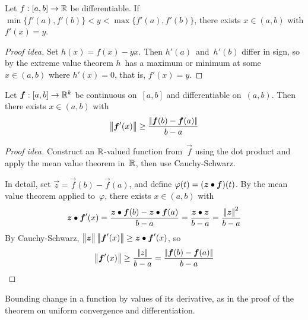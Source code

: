 \begin{thm}
Let \(f:[a,b]\to\mathbb{R}\) be differentiable. If \(\min\{f'(a),f'(b)\}<y<\max\{f'(a),f'(b)\}\), there exists \(x\in(a,b)\) with \(f'(x)=y\).
\end{thm}
\begin{proof}[Proof idea]
Set \(h(x)=f(x)-yx\). Then \(h'(a)\)~and~\(h'(b)\) differ in sign, so by the extreme value theorem \(h\)~has a maximum or minimum at some \(x\in(a,b)\) where \(h'(x)=0\), that is, \(f'(x)=y\).
\end{proof}

\begin{thm}
Let \(\boldsymbol{f}:[a,b]\to\mathbb{R}^k\) be continuous on~\([a,b]\) and differentiable on~\((a,b)\). Then there exists \(x\in(a,b)\) with
\[\left|\!\left|{\boldsymbol{f}'(x)}\right|\!\right|\ge\frac{\left|\!\left|{\boldsymbol{f}(b)-\boldsymbol{f}(a)}\right|\!\right|}{b-a}\]
\end{thm}
\begin{proof}[Proof idea]
Construct an \(\mathbb{R}\)-valued function from~\(\vec{f}\) using the dot product and apply the mean value theorem in~\(\mathbb{R}\), then use Cauchy-Schwarz.

In detail, set \(\vec{z}=\vec{f}(b)-\vec{f}(a)\), and define \(\varphi(t)=(\boldsymbol{z}\bullet\boldsymbol{f})(t)\). By the mean value theorem applied to~\(\varphi\), there exists \(x\in(a,b)\) with
\[\boldsymbol{z}\bullet\boldsymbol{f}'(x)=\frac{\boldsymbol{z}\bullet\boldsymbol{f}(b)-\boldsymbol{z}\bullet\boldsymbol{f}(a)}{b-a}=\frac{\boldsymbol{z}\bullet\boldsymbol{z}}{b-a}=\frac{\left|\!\left|{\boldsymbol{z}}\right|\!\right|^2}{b-a}\]
By Cauchy-Schwarz, \(\norm{\vec{z}\vphantom{\vec{f}'(x)}}\norm{\vec{f}'(x)}\ge\vec{z}\dotprod\vec{f}'(x)\), so
\begin{equation*}
\left|\!\left|{\boldsymbol{f}'(x)}\right|\!\right|\ge\frac{\left|\!\left|{z}\right|\!\right|}{b-a}=\frac{\left|\!\left|{\boldsymbol{f}(b)-\boldsymbol{f}(a)}\right|\!\right|}{b-a}\qedhere
\end{equation*}
\end{proof}
\begin{app}
Bounding change in a function by values of its derivative, as in the proof of the theorem on uniform convergence and differentiation.
\end{app}

